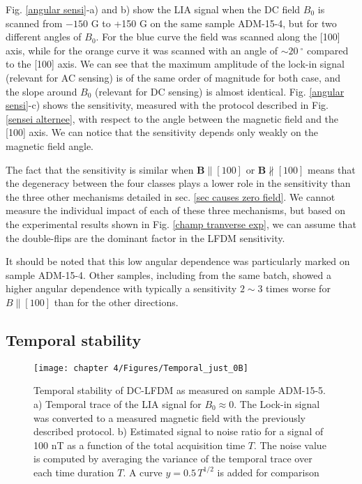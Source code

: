 \documentclass[a4paper, 11pt]{book}
\begin{document}
Fig. \ref{angular sensi}-a) and b) show the LIA signal when the DC field $B_0$ is scanned from $-150$ G to +150 G on the same sample ADM-15-4, but for two different angles of $B_0$. For the blue curve the field was scanned along the [100] axis, while for the orange curve it was scanned with an angle of $\sim 20\ ^\circ$ compared to the [100] axis. We can see that the maximum amplitude of the lock-in signal (relevant for AC sensing) is of the same order of magnitude for both case, and the slope around $B_0$ (relevant for DC sensing) is almost identical. Fig. \ref{angular sensi}-c) shows the sensitivity, measured with the protocol described in Fig. \ref{sensei alternee}, with respect to the angle between the magnetic field and the [100] axis. We can notice that the sensitivity depends only weakly on the magnetic field angle. 

The fact that the sensitivity is similar when $\mathbf{B}\parallel [100]$ or $\mathbf{B}\nparallel [100]$ means that the degeneracy between the four classes plays a lower role in the sensitivity than the three other mechanisms detailed in sec. \ref{sec causes zero field}. We cannot measure the individual impact of each of these three mechanisms, but based on the experimental results shown in Fig. \ref{champ tranverse exp}, we can assume that the double-flips are the dominant factor in the LFDM sensitivity.

It should be noted that this low angular dependence was particularly marked on sample ADM-15-4. Other samples, including from the same batch, showed a higher angular dependence with typically a sensitivity $2 \sim 3$ times worse for $B\parallel [100]$ than for the other directions.

\subsection{Temporal stability}
\begin{figure}[h!]
\centering
\texttt{[image: chapter 4/Figures/Temporal\_just\_0B]}
\caption{Temporal stability of DC-LFDM as measured on sample ADM-15-5. a) Temporal trace of the LIA signal for $B_0 \approx 0$. The Lock-in signal was converted to a measured magnetic field with the previously described protocol. b) Estimated signal to noise ratio for a signal of 100 nT as a function of the total acquisition time $T$. The noise value is computed by averaging the variance of the temporal trace over each time duration $T$. A curve $y=0.5\, T^{1/2}$ is added for comparison}
\label{temporal 0B}
\end{figure}
\end{document}
